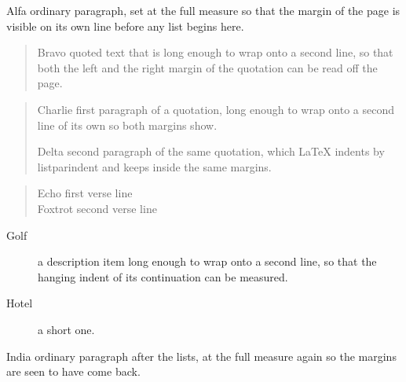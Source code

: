 \documentclass[10pt]{article}
\begin{document}
Alfa ordinary paragraph, set at the full measure so that the margin of the page is
visible on its own line before any list begins here.

\begin{quote}
Bravo quoted text that is long enough to wrap onto a second line, so that both the
left and the right margin of the quotation can be read off the page.
\end{quote}

\begin{quotation}
Charlie first paragraph of a quotation, long enough to wrap onto a second line of
its own so both margins show.

Delta second paragraph of the same quotation, which LaTeX indents by listparindent
and keeps inside the same margins.
\end{quotation}

\begin{verse}
Echo first verse line\\
Foxtrot second verse line
\end{verse}

\begin{description}
\item[Golf] a description item long enough to wrap onto a second line, so that the
hanging indent of its continuation can be measured.
\item[Hotel] a short one.
\end{description}

India ordinary paragraph after the lists, at the full measure again so the margins
are seen to have come back.
\end{document}
